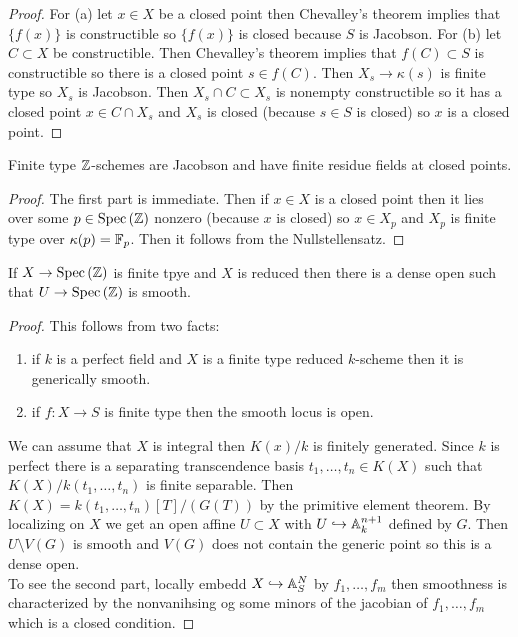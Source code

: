 \documentclass[12pt]{article}
\begin{document}
\begin{proof}
For (a) let $x \in X$ be a closed point then Chevalley's theorem implies that $\{ f(x) \}$ is constructible so $\{ f(x) \}$ is closed because $S$ is Jacobson. For (b) let $C \subset X$ be constructible. Then Chevalley's theorem implies that $f(C) \subset S$ is constructible so there is a closed point $s \in f(C)$. Then $X_s \to \kappa(s)$ is finite type so $X_s$ is Jacobson. Then $X_s \cap C \subset X_s$ is nonempty constructible so it has a closed point $x \in C \cap X_s$ and $X_s$ is closed (because $s \in S$ is closed) so $x$ is a closed point.
\end{proof}

\begin{cor}
Finite type $\mathbb{Z}$-schemes are Jacobson and have finite residue fields at closed points.
\end{cor}

\begin{proof}
The first part is immediate. Then if $x \in X$ is a closed point then it lies over some $p \in \mathrm{Spec}\left( \mathbb{Z} \right)$ nonzero (because $x$ is closed) so $x \in X_p$ and $X_p$ is finite type over $\kappa(p) = \mathbb{F}_p$. Then it follows from the Nullstellensatz.
\end{proof}

\begin{prop}
If $X \to \mathrm{Spec}\left( \mathbb{Z} \right)$ is finite tpye and $X$ is reduced then there is a dense open such that $U \to \mathrm{Spec}\left( \mathbb{Z} \right)$ is smooth.
\end{prop}

\begin{proof}
This follows from two facts:
\begin{enumerate}
\item if $k$ is a perfect field and $X$ is a finite type reduced $k$-scheme then it is generically smooth.
\item if $f : X \to S$ is finite type then the smooth locus is open. 
\end{enumerate}
We can assume that $X$ is integral then $K(x) / k$ is finitely generated. Since $k$ is perfect there is a separating transcendence basis $t_1, \dots, t_n \in K(X)$ such that $K(X) / k(t_1, \dots, t_n)$ is finite separable. Then $K(X) = k(t_1, \dots, t_n)[T]/(G(T))$ by the primitive element theorem. By localizing on $X$ we get an open affine $U \subset X$ with $U \hookrightarrow \mathbb{A}^{n+1}_k$ defined by $G$. Then $U \setminus V(G)$ is smooth and $V(G)$ does not contain the generic point so this is a dense open.
\bigskip\\
To see the second part, locally embedd $X \hookrightarrow \mathbb{A}^N_S$ by $f_1, \dots, f_m$ then smoothness is characterized by the nonvanihsing og some minors of the jacobian of $f_1, \dots, f_m$ which is a closed condition. 
\end{proof}
\end{document}
